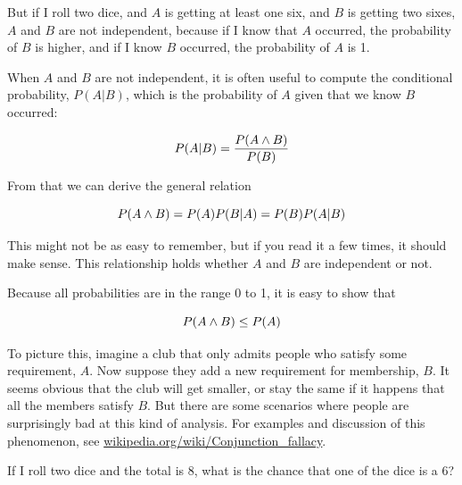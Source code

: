 \documentclass[12pt]{book}
\begin{document}
But if I roll two dice, and $A$ is getting at least one six, and
$B$ is getting two sixes, $A$ and $B$ are not independent, because
if I know that $A$ occurred, the probability of $B$ is higher, and
if I know $B$ occurred, the probability of $A$ is 1.

When $A$ and $B$ are not independent, it is often useful to compute
the conditional probability, $P(A|B)$, which is the probability of
$A$ given that we know $B$ occurred:

\[ P(A|B) = \frac{P(A \wedge B)}{P(B)} \]

From that we can derive the general relation

\[ P(A \wedge B) = P(A) P(B|A) = P(B) P(A|B) \]

This might not be as easy to remember, but if you read it a few times,
it should make sense.  This relationship holds whether $A$ and $B$
are independent or not.

Because all probabilities are in the range 0 to 1, it is
easy to show that 

\[ P(A \wedge B) \le P(A) \]

To picture this, imagine a club that only admits people who satisfy
some requirement, $A$.  Now suppose they add a new requirement for
membership, $B$.  It seems obvious that the club will get smaller, or
stay the same if it happens that all the members satisfy $B$.  But
there are some scenarios where people are surprisingly bad at this
kind of analysis.  For examples and discussion of this phenomenon, see
\url{wikipedia.org/wiki/Conjunction_fallacy}.


\begin{ex}

If I roll two dice and the total is 8, what is the chance that
one of the dice is a 6?

\end{ex}
\end{document}
